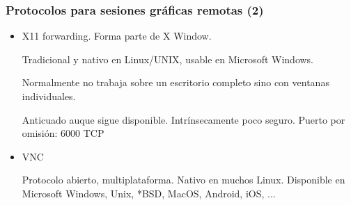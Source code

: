 \documentclass[ucs]{beamer}
\begin{document}
\begin{frame}[fragile]
\frametitle{ Protocolos para sesiones gráficas remotas (2)}
\begin{itemize}
\item
X11 forwarding. Forma parte de X Window.

Tradicional y nativo en Linux/UNIX, usable en Microsoft Windows. 

Normalmente
no trabaja sobre un escritorio
completo sino con ventanas individuales.

Anticuado auque sigue disponible. Intrínsecamente poco seguro.
Puerto por omisión: 6000 TCP

\item
VNC

Protocolo abierto, multiplataforma. Nativo en muchos Linux.  Disponible en Microsoft Windows, Unix, 
*BSD, MacOS, Android, iOS, ...

\end{itemize}
\end{frame}
\end{document}
